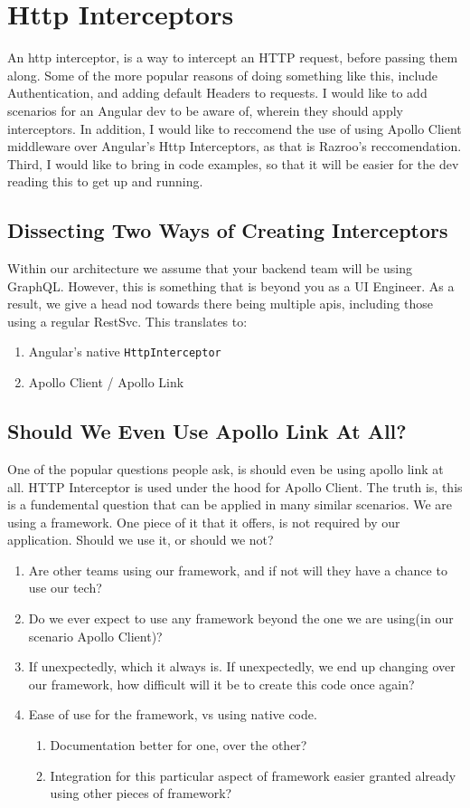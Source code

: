 \chapter{ Http Interceptors }


An http interceptor, is a way to intercept an HTTP request, before passing them
along. Some of the more popular reasons of doing something like this, include 
Authentication, and adding default Headers to requests. I would like to add 
scenarios for an Angular dev to be aware of, wherein they should apply 
interceptors. In addition, I would like to reccomend the use of using Apollo 
Client middleware over Angular's Http Interceptors, as that is Razroo's 
reccomendation. Third, I would like to bring in code examples, so that it will
be easier for the dev reading this to get up and running.

\section{Dissecting Two Ways of Creating Interceptors}
Within our architecture we assume that your backend team will be using GraphQL. 
However, this is something that is beyond you as a UI Engineer. As a result,
we give a head nod towards there being multiple apis, including those using a 
regular RestSvc. This translates to: 
\begin{enumerate}
  \item Angular's native \lstinline{HttpInterceptor}
  \item Apollo Client / Apollo Link
\end{enumerate}

\section{Should We Even Use Apollo Link At All?}
One of the popular questions people ask, is should even be using apollo link at 
all. HTTP Interceptor is used under the hood for Apollo Client. The truth is, 
this is a fundemental question that can be applied in many similar scenarios. 
We are using a framework. One piece of it that it offers, is not required by 
our application. Should we use it, or should we not? 
\begin{enumerate}
  \item Are other teams using our framework, and if not will they have a chance
  to use our tech? 
  \item Do we ever expect to use any framework beyond the one we are using(in 
  our scenario Apollo Client)? 
  \item If unexpectedly, which it always is. If unexpectedly, we end up 
  changing over our framework, how difficult will it be to create this code 
  once again? 
  \item Ease of use for the framework, vs using native code. 
  \begin{enumerate}
    \item Documentation better for one, over the other? 
    \item Integration for this particular aspect of framework easier granted 
    already using other pieces of framework? 
  \end{enumerate}
\end{enumerate}

